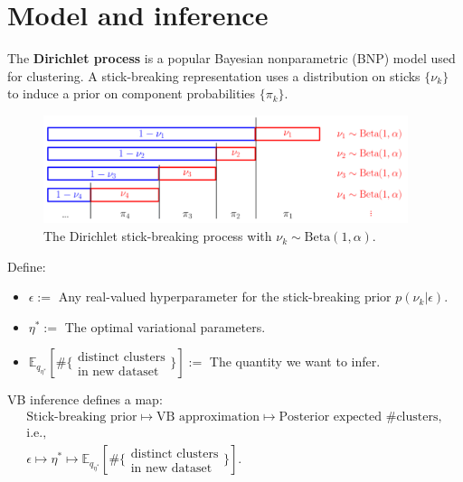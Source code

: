 \documentclass[a0,plainsections,30pt]{sciposter}\usepackage[]{graphicx}\usepackage[]{color}
\newcommand{\Expect}{\mathbb{E}}
\newcommand{\etaopt}{\eta^{*}}
\newcommand{\targetexpectation}{\Expect_{q_{\eta^*}}
\left[\#\{\substack{\text{distinct clusters}\\\text{in new dataset}}\} \right]}
\begin{document}
\begin{minipage}[t]{0.45\textwidth}
\section*{Model and inference }
\vspace{-0.3in}

The \textbf{Dirichlet process} is a popular Bayesian nonparametric
(BNP) model used for clustering.  A stick-breaking representation uses
a distribution on sticks $\{\nu_k\}$ to induce a prior on component
probabilities $\{\pi_k\}$.

\begin{figure}
\centering
\includegraphics[width = 0.95\textwidth]{./static_images/DP_stick_breaking.png}
\caption{The Dirichlet stick-breaking process with $\nu_k \sim \mathrm{Beta}(1, \alpha)$.}
\end{figure}
%
\vspace{-0.3in}
Define:
\begin{itemize}
\item $\epsilon :=$ Any real-valued hyperparameter for the stick-breaking prior
    $p(\nu_k | \epsilon)$.
\item $\etaopt :=$ The optimal variational parameters.
\item $\targetexpectation :=$ The quantity we want to infer.
\end{itemize}

\begin{mdframed}[style=MyFrame]
VB inference defines a map:
%
\begin{gather*}
\textrm{Stick-breaking prior}
    \mapsto \textrm{VB approximation}
    \mapsto \textrm{Posterior expected \# clusters},\\
\textrm{i.e.,}\\
\epsilon
    \mapsto \etaopt
    \mapsto \targetexpectation.
\end{gather*}
\end{mdframed}



\end{minipage}
\end{document}
